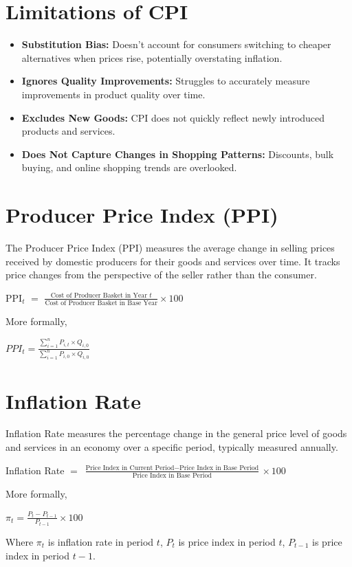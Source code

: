 \documentclass[a4paper, 11pt]{article}
\begin{document}
\section{Limitations of CPI}
\begin{itemize}
    \item \textbf{Substitution Bias:} Doesn't account for consumers switching to cheaper alternatives when prices rise, potentially overstating inflation.
    \item \textbf{Ignores Quality Improvements:} Struggles to accurately measure improvements in product quality over time.
    \item \textbf{Excludes New Goods:} CPI does not quickly reflect newly introduced products and services.
    \item \textbf{Does Not Capture Changes in Shopping Patterns:} Discounts, bulk buying, and online shopping trends are overlooked.
\end{itemize}

\section{Producer Price Index (PPI)}
The Producer Price Index (PPI) measures the average change in selling prices received by domestic producers for their goods and services over time. It tracks price changes from the perspective of the seller rather than the consumer.
\begin{center}
    PPI$_t$ $=$ $\frac{\text{Cost of Producer Basket in Year } t}{\text{Cost of Producer Basket in Base Year}} \times 100$
\end{center}
More formally,
\begin{center}
    $PPI_t = \frac{\sum_{i=1}^n P_{i,t} \times Q_{i,0}}{\sum_{i=1}^n P_{i,0} \times Q_{i,0}}$
\end{center}

\section{Inflation Rate}
Inflation Rate measures the percentage change in the general price level of goods and services in an economy over a specific period, typically measured annually.
\begin{center}
    Inflation Rate $=$ $\frac{\text{Price Index in Current Period} - \text{Price Index in Base Period}}{\text{Price Index in Base Period}} \times 100$
\end{center}
More formally,
\begin{center}
    $\pi_t=\frac{P_t-P_{t-1}}{P_{t-1}} \times 100$
\end{center}
Where $\pi_t$ is inflation rate in period $t$, $P_t$ is price index in period $t$, $P_{t-1}$ is price index in period $t-1$.
\end{document}
